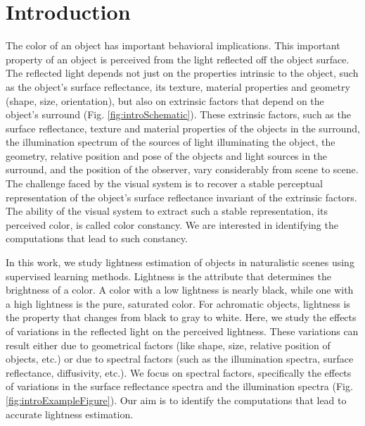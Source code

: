 \documentclass{jov}
\begin{document}
\section{Introduction}
The color of an object has important behavioral implications. This important property of an object is perceived from the light reflected off the object surface. The reflected light depends not just on the properties intrinsic to the object, such as the object's surface reflectance, its texture, material properties and geometry (shape, size, orientation), but also on extrinsic factors that depend on the object's surround (Fig. \ref{fig:introSchematic}). These extrinsic factors, such as the surface reflectance, texture and material properties of the objects in the surround, the illumination spectrum of the sources of light illuminating the object, the geometry, relative position and pose of the objects and light sources in the surround, and the position of the observer, vary considerably from scene to scene. The challenge faced by the visual system is to recover a stable perceptual representation of the object's surface reflectance invariant of the extrinsic factors. The ability of the visual system to extract such a stable representation, its perceived color, is called color constancy. We are interested in identifying the computations that lead to such constancy.

In this work, we study lightness estimation of objects in naturalistic scenes using supervised learning methods. Lightness is the attribute that determines the brightness of a color. A color with a low lightness is nearly black, while one with a high lightness is the pure, saturated color. For achromatic objects, lightness is the property that changes from black to gray to white. Here, we study the effects of variations in the reflected light on the perceived lightness. These variations can result either due to geometrical factors (like shape, size, relative position of objects, etc.) or due to spectral factors (such as the illumination spectra, surface reflectance, diffusivity, etc.). We focus on spectral factors, specifically the effects of variations in the surface reflectance spectra and the illumination spectra (Fig.\ref{fig:introExampleFigure}). Our aim is to identify the computations that lead to accurate lightness estimation.
\end{document}
